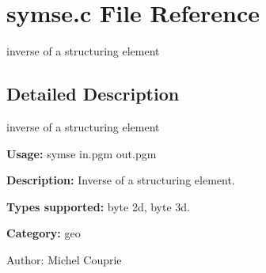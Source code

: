 \section{symse.c File Reference}
\label{symse_8c}
inverse of a structuring element 



\subsection{Detailed Description}
inverse of a structuring element 

{\bf Usage:} symse in.pgm out.pgm

{\bf Description:} Inverse of a structuring element.

{\bf Types supported:} byte 2d, byte 3d.

{\bf Category:} geo

\begin{Desc}
\item[Author:]Michel Couprie \end{Desc}
